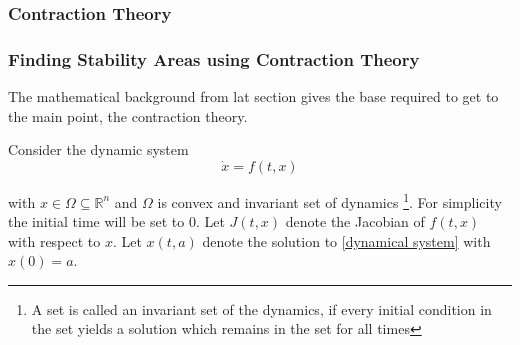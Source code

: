 \documentclass[12pt,English]{article}
\begin{document}
\subsubsection{Contraction Theory}

\subsubsection{Finding Stability Areas using Contraction Theory}
The mathematical background from lat section gives the base required to get to the main point, the contraction theory.

Consider the dynamic system
\begin{equation}\label{dynamical system}
    \dot{x}=f\left(t,x\right)
\end{equation}

with $x\in\Omega\subseteq\mathbb{R}^{n}$ and $\Omega$ is convex
and invariant set of dynamics \footnote{A set is called an invariant set of the dynamics, if every initial condition in the set yields a solution which remains in the set for all times}. For simplicity the initial time will be set to $0$. Let $J\left(t,x\right)$ denote the Jacobian of $f\left(t,x\right)$ with respect to $x.$ Let $x\left(t,a\right)$ denote the solution to \ref{dynamical system} with $x\left(0\right)=a$. 
\end{document}
